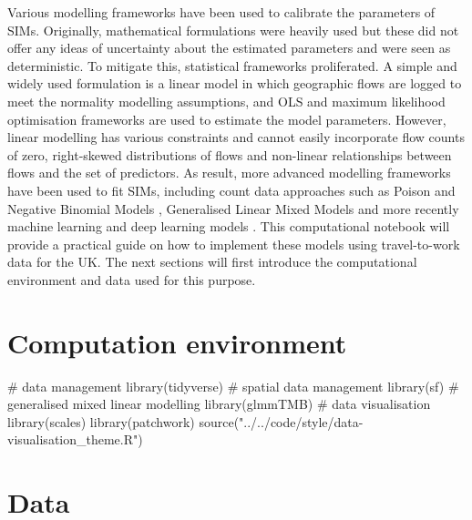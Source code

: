 \documentclass[
  a4paper, 
  twoside,
  final
]{article}
\newenvironment{Shaded}{\begin{snugshade}}{\end{snugshade}}
\newcommand{\CommentTok}[1]{\textcolor[rgb]{0.37,0.37,0.37}{#1}}
\newcommand{\FunctionTok}[1]{\textcolor[rgb]{0.28,0.35,0.67}{#1}}
\newcommand{\NormalTok}[1]{\textcolor[rgb]{0.00,0.23,0.31}{#1}}
\newcommand{\StringTok}[1]{\textcolor[rgb]{0.13,0.47,0.30}{#1}}
\newcounter{code}
\begin{document}
Various modelling frameworks have been used to calibrate the parameters
of SIMs. Originally, mathematical formulations were heavily used but
these did not offer any ideas of uncertainty about the estimated
parameters and were seen as deterministic. To mitigate this, statistical
frameworks proliferated. A simple and widely used formulation is a
linear model in which geographic flows are logged to meet the normality
modelling assumptions, and OLS and maximum likelihood optimisation
frameworks are used to estimate the model parameters. However, linear
modelling has various constraints and cannot easily incorporate flow
counts of zero, right-skewed distributions of flows and non-linear
relationships between flows and the set of predictors. As result, more
advanced modelling frameworks have been used to fit SIMs, including
count data approaches such as Poison and Negative Binomial Models
\citep{rowe2023urban}, Generalised Linear Mixed Models
\citep{apariciocastro2023} and more recently machine learning
\citep{rowe2022} and deep learning models \citep{simini2021}. This
computational notebook will provide a practical guide on how to
implement these models using travel-to-work data for the UK. The next
sections will first introduce the computational environment and data
used for this purpose.

\hypertarget{sec-comenv}{%
\section{Computation environment}\label{sec-comenv}}

\begin{Shaded}
\begin{Highlighting}[]
\CommentTok{\# data management }
\FunctionTok{library}\NormalTok{(tidyverse)}
\CommentTok{\# spatial data management}
\FunctionTok{library}\NormalTok{(sf)}
\CommentTok{\# generalised mixed linear modelling}
\FunctionTok{library}\NormalTok{(glmmTMB)}
\CommentTok{\# data visualisation}
\FunctionTok{library}\NormalTok{(scales)}
\FunctionTok{library}\NormalTok{(patchwork)}
\FunctionTok{source}\NormalTok{(}\StringTok{"../../code/style/data{-}visualisation\_theme.R"}\NormalTok{)}
\end{Highlighting}
\end{Shaded}

\hypertarget{sec-data}{%
\section{Data}\label{sec-data}}
\end{document}
